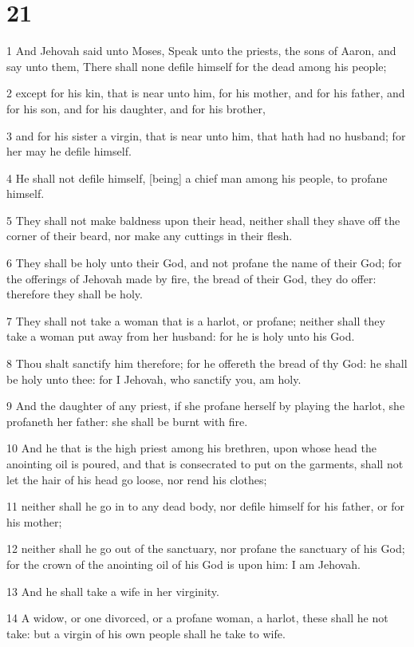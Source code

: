 \chapter{21}

\par 1 And Jehovah said unto Moses, Speak unto the priests, the sons of Aaron, and say unto them, There shall none defile himself for the dead among his people;
\par 2 except for his kin, that is near unto him, for his mother, and for his father, and for his son, and for his daughter, and for his brother,
\par 3 and for his sister a virgin, that is near unto him, that hath had no husband; for her may he defile himself.
\par 4 He shall not defile himself, [being] a chief man among his people, to profane himself.
\par 5 They shall not make baldness upon their head, neither shall they shave off the corner of their beard, nor make any cuttings in their flesh.
\par 6 They shall be holy unto their God, and not profane the name of their God; for the offerings of Jehovah made by fire, the bread of their God, they do offer: therefore they shall be holy.
\par 7 They shall not take a woman that is a harlot, or profane; neither shall they take a woman put away from her husband: for he is holy unto his God.
\par 8 Thou shalt sanctify him therefore; for he offereth the bread of thy God: he shall be holy unto thee: for I Jehovah, who sanctify you, am holy.
\par 9 And the daughter of any priest, if she profane herself by playing the harlot, she profaneth her father: she shall be burnt with fire.
\par 10 And he that is the high priest among his brethren, upon whose head the anointing oil is poured, and that is consecrated to put on the garments, shall not let the hair of his head go loose, nor rend his clothes;
\par 11 neither shall he go in to any dead body, nor defile himself for his father, or for his mother;
\par 12 neither shall he go out of the sanctuary, nor profane the sanctuary of his God; for the crown of the anointing oil of his God is upon him: I am Jehovah.
\par 13 And he shall take a wife in her virginity.
\par 14 A widow, or one divorced, or a profane woman, a harlot, these shall he not take: but a virgin of his own people shall he take to wife.
